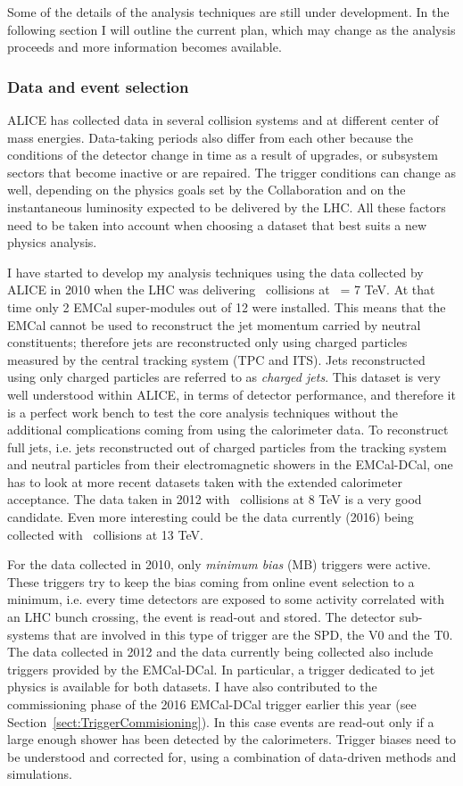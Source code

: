 \documentclass[12pt, a4paper, twoside, titlepage]{article}
\begin{document}
Some of the details of the analysis techniques are still under development. In the following section
I will outline the current plan, which may change as the analysis proceeds and more information becomes available.

\subsubsection{Data and event selection}
ALICE has collected data in several collision systems and at different center of mass energies.
Data-taking periods also differ from each other because the conditions of the detector change in time as a result of upgrades,
or subsystem sectors that become inactive or are repaired. The trigger conditions can change as well, depending on the
physics goals set by the Collaboration and on the instantaneous luminosity expected to be delivered by the LHC.
All these factors need to be taken into account when choosing a dataset that best suits a new physics analysis.

I have started to develop my analysis techniques using the data collected by ALICE in 2010 when the LHC was
delivering \pp\ collisions at \s\ = 7 TeV. At that time only 2 EMCal super-modules out of 12 were installed.
This means that the EMCal cannot be used to reconstruct the jet momentum carried by neutral constituents; therefore jets are
reconstructed only using charged particles measured by the central tracking system (TPC and ITS).
Jets reconstructed using only charged particles are referred to as \emph{charged jets}. This dataset is very
well understood within ALICE, in terms of detector performance, and therefore it is a perfect work bench
to test the core analysis techniques without the additional complications coming from using the calorimeter data.
To reconstruct full jets, i.e. jets reconstructed out of charged particles from the tracking system and neutral particles from their
electromagnetic showers in the EMCal-DCal, one has to look at more recent datasets taken with the extended calorimeter acceptance.
The data taken in 2012 with \pp\ collisions at 8 TeV is a very good candidate. Even more interesting could be the data currently (2016)
being collected with \pp\ collisions at 13 TeV.

For the data collected in 2010, only \emph{minimum bias} (MB) triggers were active. These triggers
try to keep the bias coming from online event selection to a minimum, i.e. every time detectors
are exposed to some activity correlated with an LHC bunch crossing, the event is read-out and stored.
The detector sub-systems that are involved in this type of trigger are the SPD, the V0 and the T0.
The data collected in 2012 and the data currently being collected also include triggers
provided by the EMCal-DCal. In particular, a trigger dedicated to jet physics is available for both datasets. 
I have also contributed to the commissioning phase of the 2016 EMCal-DCal trigger earlier this year (see Section~\ref{sect:TriggerCommisioning}).
In this case events are read-out only if a large enough shower has been detected by the calorimeters.
Trigger biases need to be understood and corrected for, using a combination of data-driven methods and simulations.
\end{document}

